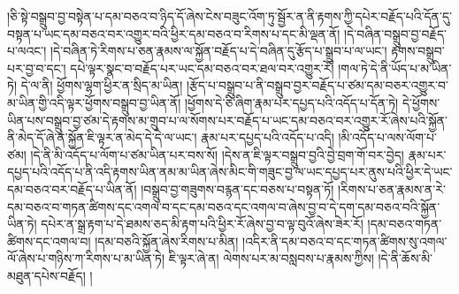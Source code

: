 །ཅི་སྟེ་བསྒྲུབ་བྱ་བསྟེན་པ་དམ་བཅའ་བ་ཉིད་དོ་ཞེས་ངེས་བཟུང་འོག་ཏུ་སྦྱོར་ན་ནི་རྟགས་ཀྱི་དཔེར་བརྗོད་པའི་དོན་དུ་བསྟན་པ་ཡང་དམ་བཅའ་བར་འགྱུར་བའི་ཕྱིར་དམ་བཅའ་བ་རིགས་པ་དང་མི་ལྡན་ནོ། །དེ་བཞིན་བསྒྲུབ་བྱ་བརྗོད་པ་ལའང་། །དེ་བཞིན་ཏེ་རིགས་པ་ཅན་རྣམས་ལ་སྐྱོན་བརྗོད་པ་དེ་བཞིན་དུ་རྩོད་པ་སྒྲུབ་པ་ལ་ཡང་། རྟགས་བསྒྲུབ་པར་བྱ་བ་དང་། དཔེ་ལྟར་སྣང་བ་བརྗོད་པར་ཡང་དམ་བཅའ་བར་ཐལ་བར་འགྱུར་རོ། །གལ་ཏེ་དེ་ནི་ཡོད་པ་མ་ཡིན་ཏེ། དེ་ལ་ནི། ཕྱོགས་ལྷག་ཕྱིར་ན་སྲིད་མ་ཡིན། །རྩོད་པ་བསྒྲུབ་པ་ནི་བསྒྲུབ་བྱར་བརྗོད་པ་ཙམ་དམ་བཅར་འགྱུར་བ་མ་ཡིན་གྱི་འདི་ལྟར་ཕྱོགས་བསྒྲུབ་བྱ་ཡིན་ནོ། །ཕྱོགས་དེ་ཅི་ཞིག་རྣམ་པར་དཔྱད་པའི་འདོད་པ་དོན་ཏེ། དེ་ཕྱོགས་ཡིན་པས་བསྒྲུབ་བྱ་ཙམ་དེ་རྟགས་མ་གྲུབ་པ་ལ་སོགས་པར་བརྗོད་པ་ཡང་དམ་བཅའ་བར་འགྱུར་རོ་ཞེས་པའི་སྐྱོན་ནི་མེད་དོ་ཞེ་ན་སྐྱོན་ཇི་ལྟར་ན་མེད་དེ་དེ་ལ་ཡང་། རྣམ་པར་དཔྱད་པའི་འདོད་པ་འདི། །མི་འདོད་པ་ལས་ལོག་པ་ཙམ། །དེ་ནི་མི་འདོད་པ་ལོག་པ་ཙམ་ཡིན་པར་བས་སོ། །དེས་ན་ཇི་ལྟར་བསྒྲུབ་བྱའི་བྱེ་བྲག་གོ་བར་བྱེད། རྣམ་པར་དཔྱད་པའི་འདོད་པ་ནི་འདི་རྟགས་ཡིན་ནམ་མ་ཡིན་ཞེས་མིང་གི་གཟུང་བྱ་ལ་ཡང་དཔྱད་པར་ནུས་པའི་ཕྱིར་དེ་ཡང་དམ་བཅའ་བར་བརྗོད་པ་ཡིན་ནོ། །བསྒྲུབ་བྱ་གཟུགས་བརྙན་དང་བཅས་པ་བསྟན་ཏོ། །རིགས་པ་ཅན་རྣམས་ན་རེ་དམ་བཅའ་བ་གཏན་ཚིགས་དང་འགལ་བ་དང་དམ་བཅའ་དང་འགལ་བ་ཞེས་བྱ་བ་དེ་དག་དམ་བཅའ་བའི་སྐྱོན་ཡིན་ཏེ། དཔེར་ན་སྒྲ་རྟག་པ་དེ་ཐམས་ཅད་མི་རྟག་པའི་ཕྱིར་རོ་ཞེས་བྱ་བ་ལྟ་བུའོ་ཞེས་ཟེར་རོ། །དམ་བཅའ་གཏན་ཚིགས་དང་འགལ་བ། །དམ་བཅའི་སྐྱོན་ཞེས་རིགས་པ་མིན། །འདིར་ནི་དམ་བཅའ་བ་དང་གཏན་ཚིགས་སུ་འགལ་ལོ་ཞེས་པ་གཉིས་ཀ་རིགས་པ་མ་ཡིན་ཏེ། ཇི་ལྟར་ཞེ་ན། ལེགས་པར་མ་བསླབས་པ་རྣམས་ཀྱིས། །དེ་ནི་ཆོས་མི་མཐུན་དཔེས་བརྗོད། །
